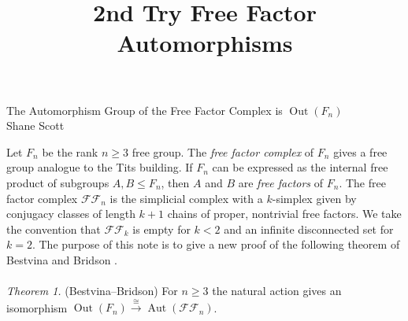 \documentclass[11pt]{article}
\title{2nd Try Free Factor Automorphisms}
\newcommand{\Aut}[1]{\ensuremath{ \aaut \left (#1 \right ) }}
\newcommand{\outn}{{\ensuremath{ \oout(F_n)}} }
\newcommand{\ffn}{{\ensuremath{ \mathcal {FF}_n }}}
\DeclareMathOperator{\oout}{Out}
\DeclareMathOperator{\aaut}{Aut}
\begin{document}
\begin{center}
{The Automorphism Group of the Free Factor Complex is \outn}\\
Shane Scott
\end{center}

Let $F_n$ be the rank $n\geq 3$ free group.
The \emph{free factor complex} of $F_n$ gives a free group analogue to the Tits building.
If $F_n$ can be expressed as the internal free product of subgroups $A,B \leqslant F_n$, then $A$ and $B$ are \emph{free factors} of $F_n$.
The free factor complex $\mathcal {FF}_n$ is the simplicial complex with a $k$-simplex given by conjugacy classes of length $k+1$ chains of proper, nontrivial free factors.
We take the convention that $\mathcal{FF}_k$ is empty for $k<2$ and an infinite disconnected set for $k=2$.
The purpose of this note is to give a new proof of the following theorem of Bestvina and Bridson \cite{bridson}.\\
\\
\noindent \emph{Theorem 1.} (Bestvina--Bridson) For $n \geq 3$ the natural action gives an isomorphism $ \outn \stackrel{\cong}{\longrightarrow} \Aut{\ffn}$.\\
\end{document}
